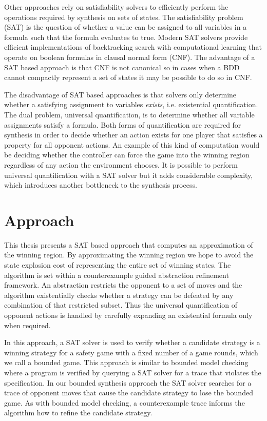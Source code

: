 Other approaches rely on satisfiability solvers to efficiently perform the operations required by synthesis on sets of states. The satisfiability problem (SAT) is the question of whether a value can be assigned to all variables in a formula such that the formula evaluates to true. Modern SAT solvers provide efficient implementations of backtracking search with computational learning that operate on boolean formulas in clausal normal form (CNF). The advantage of a SAT based approach is that CNF is not canonical so in cases when a BDD cannot compactly represent a set of states it may be possible to do so in CNF.

The disadvantage of SAT based approaches is that solvers only determine whether a satisfying assignment to variables \emph{exists}, i.e. existential quantification. The dual problem, universal quantification, is to determine whether all variable assignments satisfy a formula. Both forms of quantification are required for synthesis in order to decide whether an action exists for one player that satisfies a property for all opponent actions. An example of this kind of computation would be deciding whether the controller can force the game into the winning region regardless of any action the environment chooses. It is possible to perform universal quantification with a SAT solver but it adds considerable complexity, which introduces another bottleneck to the synthesis process.

\section{Approach}

This thesis presents a SAT based approach that computes an approximation of the winning region. By approximating the winning region we hope to avoid the state explosion cost of representing the entire set of winning states. The algorithm is set within a counterexample guided abstraction refinement framework. An abstraction restricts the opponent to a set of moves and the algorithm existentially checks whether a strategy can be defeated by any combination of that restricted subset. Thus the universal quantification of opponent actions is handled by carefully expanding an existential formula only when required.

In this approach, a SAT solver is used to verify whether a candidate strategy is a winning strategy for a safety game with a fixed number of a game rounds, which we call a bounded game. This approach is similar to bounded model checking where a program is verified by querying a SAT solver for a trace that violates the specification. In our bounded synthesis approach the SAT solver searches for a trace of opponent moves that cause the candidate strategy to lose the bounded game. As with bounded model checking, a counterexample trace informs the algorithm how to refine the candidate strategy.

